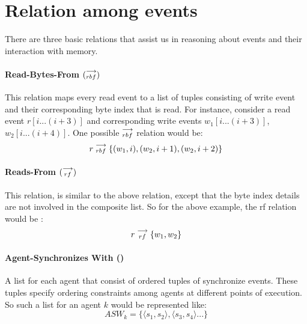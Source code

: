     \section{Relation among events}
        There are three basic relations that assist us in reasoning about events and their interaction with memory.
        
        \paragraph{Read-Bytes-From $(\stackrel{\longrightarrow}{_{rbf}})$}
        
        This relation maps every read event to a list of tuples consisting of write event and their corresponding byte index that is read. For instance, consider a read event $r[i...(i+3)]$ and corresponding write events $w_1[i...(i+3)]$, $w_2[i...(i+4)]$. One possible $\stackrel{\longrightarrow}{_{rbf}}$ relation would be: \[r \stackrel{\longrightarrow}{_{rbf}} \{(w_1, i), (w_2, i+1), (w_2, i+2)\}\]
        
        
        \paragraph{Reads-From $(\stackrel{\longrightarrow}{_{rf}})$}
        
        This relation, is similar to the above relation, except that the byte index details are not involved in the composite list. So for the above example, the rf relation would be :  \[r \stackrel{\longrightarrow}{_{rf}} \{w_1,w_2\}\]
        
        
        \paragraph{Agent-Synchronizes With ()}
        
        A list for each agent that consist of ordered tuples of synchronize events. These tuples specify ordering constraints among agents at different points of execution. So such a list for an agent $k$ would be represented like:  
        \[ASW_k = \{ \langle s_1, s_2 \rangle, \langle s_3, s_4 \rangle ...\}\]
        
